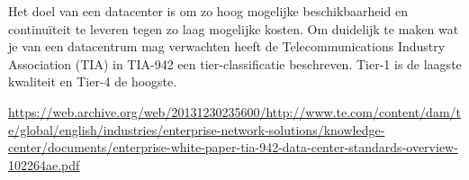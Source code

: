 Het doel van een datacenter is om zo hoog mogelijke beschikbaarheid en continu\"iteit te leveren tegen zo laag mogelijke kosten. Om duidelijk te maken wat je van een datacentrum mag verwachten heeft de Telecommunications Industry Association (TIA) in TIA-942 een tier-classificatie beschreven. Tier-1 is de laagste kwaliteit en Tier-4 de hoogste.

\url{https://web.archive.org/web/20131230235600/http://www.te.com/content/dam/te/global/english/industries/enterprise-network-solutions/knowledge-center/documents/enterprise-white-paper-tia-942-data-center-standards-overview-102264ae.pdf}
